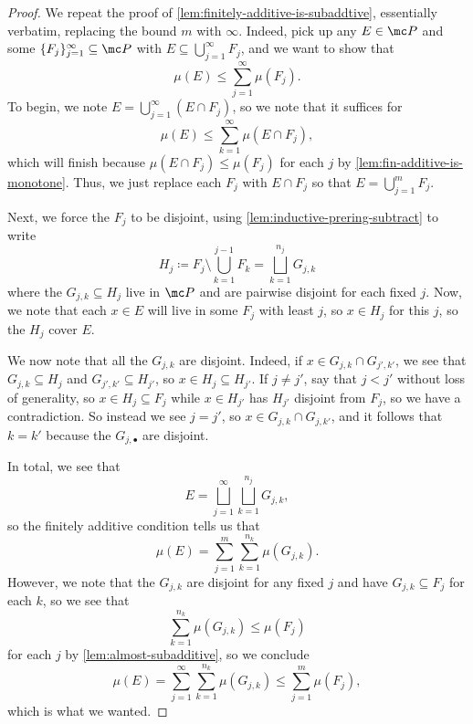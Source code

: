 \documentclass[../notes.tex]{subfiles}
\begin{document}
\begin{proof}
	We repeat the proof of \autoref{lem:finitely-additive-is-subaddtive}, essentially verbatim, replacing the bound $m$ with $\infty$. Indeed, pick up any $E\in\mc P$ and some $\{F_j\}_{j=1}^\infty\subseteq\mc P$ with $E\subseteq\bigcup_{j=1}^\infty F_j$, and we want to show that
	\[\mu(E)\le\sum_{j=1}^\infty\mu(F_j).\]
	To begin, we note $E=\bigcup_{j=1}^\infty(E\cap F_j)$, so we note that it suffices for
	\[\mu(E)\le\sum_{k=1}^\infty\mu(E\cap F_j),\]
	which will finish because $\mu(E\cap F_j)\le\mu(F_j)$ for each $j$ by \autoref{lem:fin-additive-is-monotone}. Thus, we just replace each $F_j$ with $E\cap F_j$ so that $E=\bigcup_{j=1}^mF_j$.
	
	Next, we force the $F_j$ to be disjoint, using \autoref{lem:inductive-prering-subtract} to write
	\[H_j\coloneqq F_j\setminus\bigcup_{k=1}^{j-1}F_k=\bigsqcup_{k=1}^{n_j}G_{j,k}\]
	where the $G_{j,k}\subseteq H_j$ live in $\mc P$ and are pairwise disjoint for each fixed $j$. Now, we note that each $x\in E$ will live in some $F_j$ with least $j$, so $x\in H_j$ for this $j$, so the $H_j$ cover $E$.

	We now note that all the $G_{j,k}$ are disjoint. Indeed, if $x\in G_{j,k}\cap G_{j',k'}$, we see that $G_{j,k}\subseteq H_j$ and $G_{j',k'}\subseteq H_{j'}$, so $x\in H_j\subseteq H_{j'}$. If $j\ne j'$, say that $j<j'$ without loss of generality, so $x\in H_j\subseteq F_j$ while $x\in H_{j'}$ has $H_{j'}$ disjoint from $F_j$, so we have a contradiction. So instead we see $j=j'$, so $x\in G_{j,k}\cap G_{j,k'}$, and it follows that $k=k'$ because the $G_{j,\bullet}$ are disjoint.

	In total, we see that
	\[E=\bigsqcup_{j=1}^\infty\bigsqcup_{k=1}^{n_j}G_{j,k},\]
	so the finitely additive condition tells us that
	\[\mu(E)=\sum_{j=1}^m\sum_{k=1}^{n_k}\mu(G_{j,k}).\]
	However, we note that the $G_{j,k}$ are disjoint for any fixed $j$ and have $G_{j,k}\subseteq F_j$ for each $k$, so we see that
	\[\sum_{k=1}^{n_k}\mu(G_{j,k})\le\mu(F_j)\]
	for each $j$ by \autoref{lem:almost-subadditive}, so we conclude
	\[\mu(E)=\sum_{j=1}^\infty\sum_{k=1}^{n_k}\mu(G_{j,k})\le\sum_{j=1}^m\mu(F_j),\]
	which is what we wanted.
\end{proof}
\end{document}
